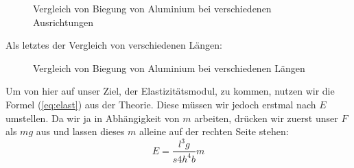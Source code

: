 \documentclass[11pt,a4paper]{article}
\begin{document}
\begin{figure}[h]
\centering
{}
\renewcommand\thefigure{2}
\caption[Vergleich von Biegung von Aluminium bei verschiedenen Ausrichtungen]{Vergleich von Biegung von Aluminium bei verschiedenen Ausrichtungen}
\label{Abb:2}
\end{figure}

\pagebreak

Als letztes der Vergleich von verschiedenen L\"angen:
\begin{figure}[h]
\centering
{}
\renewcommand\thefigure{3}
\caption[Vergleich von Biegung von Aluminium bei verschiedenen L\"angen]{Vergleich von Biegung von Aluminium bei verschiedenen L\"angen}
\label{Abb:3}
\end{figure}

\pagebreak

Um von hier auf unser Ziel, der Elastizit\"atsmodul, zu kommen, nutzen wir die Formel (\ref{eq:elast}) aus der Theorie. Diese m\"ussen wir jedoch erstmal nach $E$ umstellen. Da wir ja in Abh\"angigkeit von $m$ arbeiten, dr\"ucken wir zuerst unser $F$ als $mg$ aus und lassen dieses $m$ alleine auf der rechten Seite stehen:
\[
E=\frac{l^3g}{s4h^4b}m
\]
\end{document}
